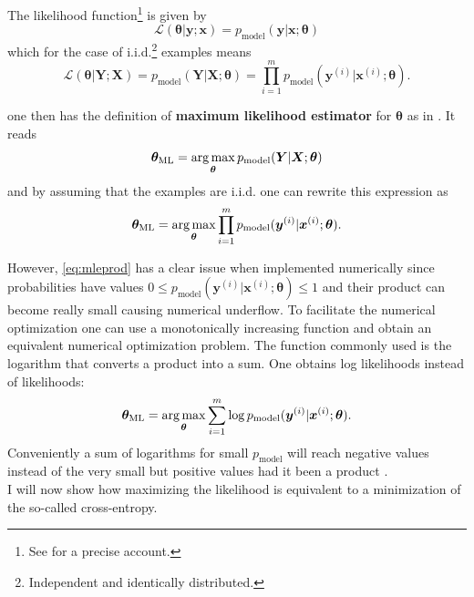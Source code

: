 The likelihood function\footnote{See \citet{Rossi2018MathematicalInference} for a precise account.} is given by 
\begin{equation}
    \mathcal{L}(\bm{\theta}|\textbf{y}; \textbf{x}) = p_{\text{model}}(\textbf{y}|\textbf{x}; \bm{\theta})
\end{equation}
which for the case of i.i.d.\footnote{Independent and identically distributed.} examples means
\begin{equation} \label{eq:likelihoodiid}
    \mathcal{L}(\bm{\theta}|\bm{Y}; \bm{X}) = p_{\text{model}}(\bm{Y}|\bm{X}; \bm{\theta}) = \prod_{i=1}^{m} p_{\text{model}}(\bm{y}^{(i)}|\bm{x}^{(i)}; \bm{\theta}).
\end{equation}

one then has the definition of \textbf{maximum likelihood estimator} for $\bm{\theta}$ as in \citet{Goodfellow2016}. It reads
\begin{equation}
    \bm{\theta}_{\text{ML}} = \operatorname*{\arg\max}_{\bm{\theta}} p_{\text{model}}(\bm{Y}|\bm{X}; \bm{\theta})
\end{equation}
and by assuming that the examples are i.i.d. one can rewrite this expression as
\begin{equation} \label{eq:mleprod}
    \bm{\theta}_{\text{ML}} = \operatorname*{\arg\max}_{\bm{\theta}} \prod_{i=1}^m p_{\text{model}}(\bm{y}^{(i)}|\bm{x}^{(i)}; \bm{\theta}).
\end{equation}

However, \cref{eq:mleprod} has a clear issue when implemented numerically since probabilities have values $0\leq p_{\text{model}}(\bm{y}^{(i)}|\bm{x}^{(i)}; \bm{\theta}) \leq 1$ and their product can become really small causing numerical underflow. To facilitate the numerical optimization one can use a monotonically increasing function and obtain an equivalent numerical optimization problem. The function commonly used is the logarithm that converts a product into a sum. One obtains log likelihoods instead of likelihoods:
\begin{equation} \label{eq:maxlikelihood}
    \bm{\theta}_{\text{ML}} = \operatorname*{\arg\max}_{\bm{\theta}} \sum_{i=1}^m \log p_{\text{model}}(\bm{y}^{(i)}|\bm{x}^{(i)}; \bm{\theta}).
\end{equation}
Conveniently a sum of logarithms for small $p_{\text{model}}$ will reach negative values instead of the very small but positive values had it been a product \citep{Goodfellow2016}. \\

I will now show how maximizing the likelihood is equivalent to a minimization of the so-called cross-entropy.
